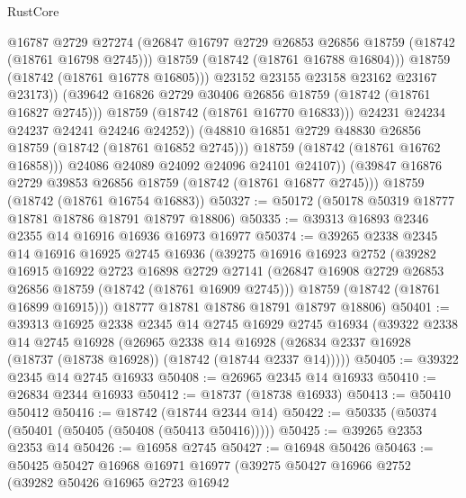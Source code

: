 \begin{lexlean}{RustCore}
\begin{coremodule}
                        @16787
                        @2729
                        @27274
                        (@26847 @16797 @2729 @26853 @26856 @18759 (@18742 (@18761 @16798 @2745)))
                        @18759
                        (@18742 (@18761 @16788 @16804)))
                      @18759
                      (@18742 (@18761 @16778 @16805)))
                    @23152
                    @23155
                    @23158
                    @23162
                    @23167
                    @23173))
                (@39642 @16826 @2729 @30406 @26856 @18759 (@18742 (@18761 @16827 @2745)))
                @18759
                (@18742 (@18761 @16770 @16833)))
              @24231
              @24234
              @24237
              @24241
              @24246
              @24252))
          (@48810 @16851 @2729 @48830 @26856 @18759 (@18742 (@18761 @16852 @2745)))
          @18759
          (@18742 (@18761 @16762 @16858)))
        @24086
        @24089
        @24092
        @24096
        @24101
        @24107))
    (@39847 @16876 @2729 @39853 @26856 @18759 (@18742 (@18761 @16877 @2745)))
    @18759
    (@18742 (@18761 @16754 @16883))
@50327 := @50172 (@50178 @50319 @18777 @18781 @18786 @18791 @18797 @18806)
@50335 := @39313 @16893 @2346 @2355 @14 @16916 @16936 @16973 @16977
@50374 := @39265
    @2338
    @2345
    @14
    @16916
    @16925
    @2745
    @16936
    (@39275
      @16916
      @16923
      @2752
      (@39282
        @16915
        @16922
        @2723
        @16898
        @2729
        @27141
        (@26847 @16908 @2729 @26853 @26856 @18759 (@18742 (@18761 @16909 @2745)))
        @18759
        (@18742 (@18761 @16899 @16915)))
      @18777
      @18781
      @18786
      @18791
      @18797
      @18806)
@50401 := @39313
    @16925
    @2338
    @2345
    @14
    @2745
    @16929
    @2745
    @16934
    (@39322
      @2338
      @14
      @2745
      @16928
      (@26965
        @2338
        @14
        @16928
        (@26834 @2337 @16928 (@18737 (@18738 @16928)) (@18742 (@18744 @2337 @14)))))
@50405 := @39322 @2345 @14 @2745 @16933
@50408 := @26965 @2345 @14 @16933
@50410 := @26834 @2344 @16933
@50412 := @18737 (@18738 @16933)
@50413 := @50410 @50412
@50416 := @18742 (@18744 @2344 @14)
@50422 := @50335 (@50374 (@50401 (@50405 (@50408 (@50413 @50416)))))
@50425 := @39265 @2353 @2353 @14
@50426 := @16958 @2745
@50427 := @16948 @50426
@50463 := @50425
    @50427
    @16968
    @16971
    @16977
    (@39275
      @50427
      @16966
      @2752
      (@39282
        @50426
        @16965
        @2723
        @16942

\end{coremodule}
\end{lexlean}
